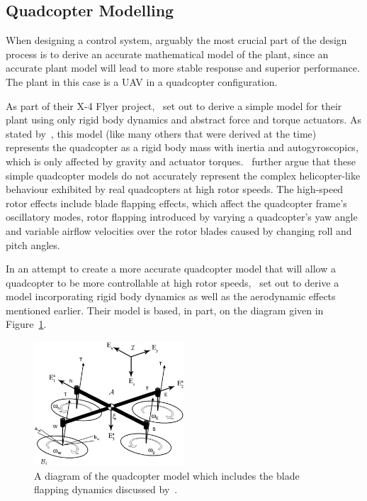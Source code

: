 \subsection{Quadcopter Modelling}

When designing a control system, arguably the most crucial part of the design process is to derive an accurate mathematical model of the plant, since an accurate plant model will lead to more stable response and superior performance. The plant in this case is a UAV in a quadcopter configuration. 

As part of their X-4 Flyer project,~\cite{hamel2002dynamic} set out to derive a simple model for their plant using only rigid body dynamics and abstract force and torque actuators. As stated by~\cite{Pounds2010c}, this model (like many others that were derived at the time) represents the quadcopter as a rigid body mass with inertia and autogyroscopics, which is only affected by gravity and actuator torques.~\citeauthor{Pounds2010c} further argue that these simple quadcopter models do not accurately represent the complex helicopter-like behaviour exhibited by real quadcopters at high rotor speeds. The high-speed rotor effects include blade flapping effects, which affect the quadcopter frame's oscillatory modes, rotor flapping introduced by varying a quadcopter's yaw angle and variable airflow velocities over the rotor blades caused by changing roll and pitch angles.

In an attempt to create a more accurate quadcopter model that will allow a quadcopter to be more controllable at high rotor speeds,~\citeauthor{Pounds2010c} set out to derive a model incorporating rigid body dynamics as well as the aerodynamic effects mentioned earlier. Their model is based, in part, on the diagram given in Figure~\ref{fig:chap2-quad-model}.

\begin{figure}
  \centering
  \includegraphics[width=0.5\textwidth]{figures/chapter2/pounds_quad-model.jpg}
  \caption[Diagram of the quadcopter model.]{A diagram of the quadcopter model which includes the blade flapping dynamics discussed by~\cite{Pounds2010c}.}
\label{fig:chap2-quad-model}
\end{figure}

